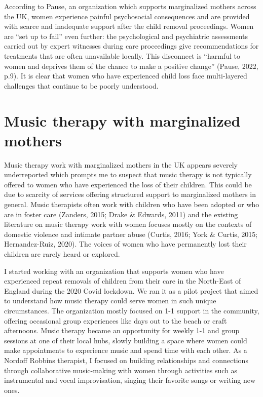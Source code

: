 \documentclass[authordate, empirical]{jote-new-article}
\begin{document}
According to Pause, an organization which supports marginalized mothers across the UK, women experience painful psychosocial consequences and are provided with scarce and inadequate support after the child removal proceedings. Women are “set up to fail” even further: the psychological and psychiatric assessments carried out by expert witnesses during care proceedings give recommendations for treatments that are often unavailable locally. This disconnect is “harmful to women and deprives them of the chance to make a positive change” (Pause, 2022, p.9). It is clear that women who have experienced child loss face multi-layered challenges that continue to be poorly understood.







\section{Music therapy with marginalized \mbox{mothers}}







Music therapy work with marginalized mothers in the UK appears severely underreported which prompts me to suspect that music therapy is not typically offered to women who have experienced the loss of their children. This could be due to scarcity of services offering structured support to marginalized mothers in general. Music therapists often work with children who have been adopted or who are in foster care (Zanders, 2015; Drake \& Edwards, 2011) and the existing literature on music therapy work with women focuses mostly on the contexts of domestic violence and intimate partner abuse (Curtis, 2016; York \& Curtis, 2015; Hernandez-Ruiz, 2020). The voices of women who have permanently lost their children are rarely heard or explored.







I started working with an organization that supports women who have experienced repeat removals of children from their care in the North-East of England during the 2020 Covid lockdown. We ran it as a pilot project that aimed to understand how music therapy could serve women in such unique circumstances. The organization mostly focused on 1-1 support in the community, offering occasional group experiences like days out to the beach or craft afternoons. Music therapy became an opportunity for weekly 1-1 and group sessions at one of their local hubs, slowly building a space where women could make appointments to experience music and spend time with each other. As a Nordoff Robbins therapist, I focused on building relationships and connections through collaborative music-making with women through activities such as instrumental and vocal improvisation, singing their favorite songs or writing new ones.
\end{document}
